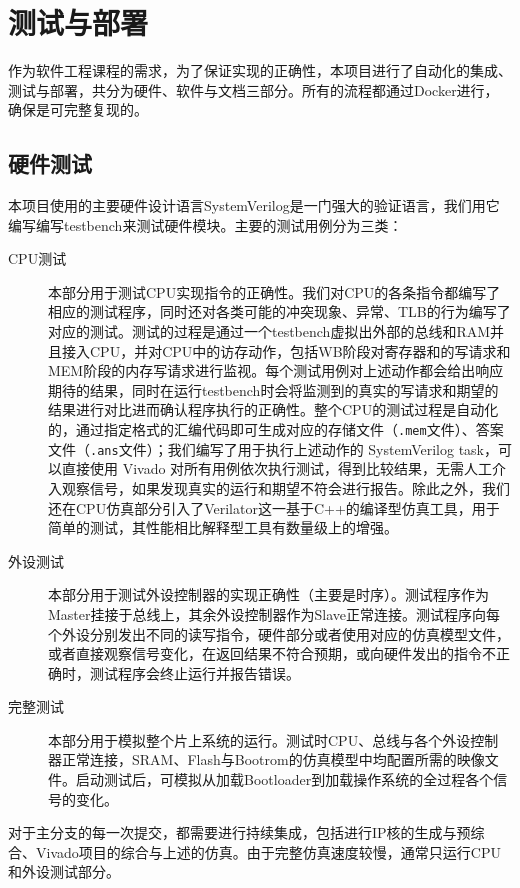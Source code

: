\chapter{测试与部署}

作为软件工程课程的需求，为了保证实现的正确性，本项目进行了自动化的集成、测试与部署，共分为硬件、软件与文档三部分。所有的流程都通过Docker进行，确保是可完整复现的。

\section{硬件测试}
\label{section:test_hardware}

本项目使用的主要硬件设计语言SystemVerilog是一门强大的验证语言，我们用它编写编写testbench来测试硬件模块。主要的测试用例分为三类：

\begin{description}
    \item[CPU测试] 本部分用于测试CPU实现指令的正确性。我们对CPU的各条指令都编写了相应的测试程序，同时还对各类可能的冲突现象、异常、TLB的行为编写了对应的测试。测试的过程是通过一个testbench虚拟出外部的总线和RAM并且接入CPU，并对CPU中的访存动作，包括WB阶段对寄存器和的写请求和MEM阶段的内存写请求进行监视。每个测试用例对上述动作都会给出响应期待的结果，同时在运行testbench时会将监测到的真实的写请求和期望的结果进行对比进而确认程序执行的正确性。整个CPU的测试过程是自动化的，通过指定格式的汇编代码即可生成对应的存储文件（\texttt{.mem}文件）、答案文件（\texttt{.ans}文件）；我们编写了用于执行上述动作的 SystemVerilog task，可以直接使用 Vivado 对所有用例依次执行测试，得到比较结果，无需人工介入观察信号，如果发现真实的运行和期望不符会进行报告。除此之外，我们还在CPU仿真部分引入了Verilator这一基于C++的编译型仿真工具，用于简单的测试，其性能相比解释型工具有数量级上的增强。
    \item[外设测试] 本部分用于测试外设控制器的实现正确性（主要是时序）。测试程序作为Master挂接于总线上，其余外设控制器作为Slave正常连接。测试程序向每个外设分别发出不同的读写指令，硬件部分或者使用对应的仿真模型文件，或者直接观察信号变化，在返回结果不符合预期，或向硬件发出的指令不正确时，测试程序会终止运行并报告错误。
    \item[完整测试] 本部分用于模拟整个片上系统的运行。测试时CPU、总线与各个外设控制器正常连接，SRAM、Flash与Bootrom的仿真模型中均配置所需的映像文件。启动测试后，可模拟从加载Bootloader到加载操作系统的全过程各个信号的变化。
\end{description}

对于主分支的每一次提交，都需要进行持续集成，包括进行IP核的生成与预综合、Vivado项目的综合与上述的仿真。由于完整仿真速度较慢，通常只运行CPU和外设测试部分。

